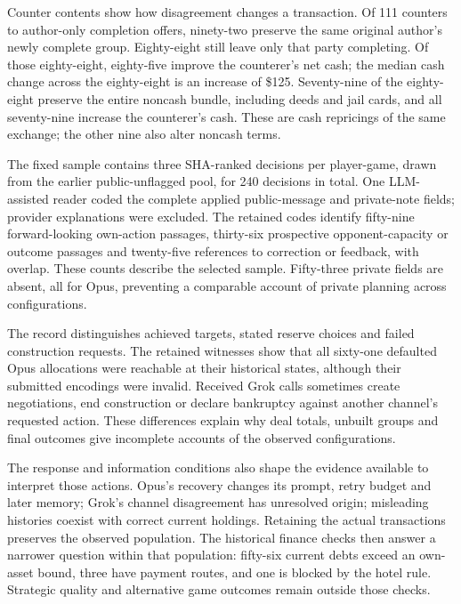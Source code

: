 
Counter contents show how disagreement changes a transaction. Of 111 counters to author-only completion offers, ninety-two preserve the same original author's newly complete group. Eighty-eight still leave only that party completing. Of those eighty-eight, eighty-five improve the counterer's net cash; the median cash change across the eighty-eight is an increase of \$125. Seventy-nine of the eighty-eight preserve the entire noncash bundle, including deeds and jail cards, and all seventy-nine increase the counterer's cash. These are cash repricings of the same exchange; the other nine also alter noncash terms.

The fixed sample contains three SHA-ranked decisions per player-game, drawn from the earlier public-unflagged pool, for 240 decisions in total. One LLM-assisted reader coded the complete applied public-message and private-note fields; provider explanations were excluded. The retained codes identify fifty-nine forward-looking own-action passages, thirty-six prospective opponent-capacity or outcome passages and twenty-five references to correction or feedback, with overlap. These counts describe the selected sample. Fifty-three private fields are absent, all for Opus, preventing a comparable account of private planning across configurations.

The record distinguishes achieved targets, stated reserve choices and failed construction requests. The retained witnesses show that all sixty-one defaulted Opus allocations were reachable at their historical states, although their submitted encodings were invalid. Received Grok calls sometimes create negotiations, end construction or declare bankruptcy against another channel's requested action. These differences explain why deal totals, unbuilt groups and final outcomes give incomplete accounts of the observed configurations.

The response and information conditions also shape the evidence available to interpret those actions. Opus's recovery changes its prompt, retry budget and later memory; Grok's channel disagreement has unresolved origin; misleading histories coexist with correct current holdings. Retaining the actual transactions preserves the observed population. The historical finance checks then answer a narrower question within that population: fifty-six current debts exceed an own-asset bound, three have payment routes, and one is blocked by the hotel rule. Strategic quality and alternative game outcomes remain outside those checks.

